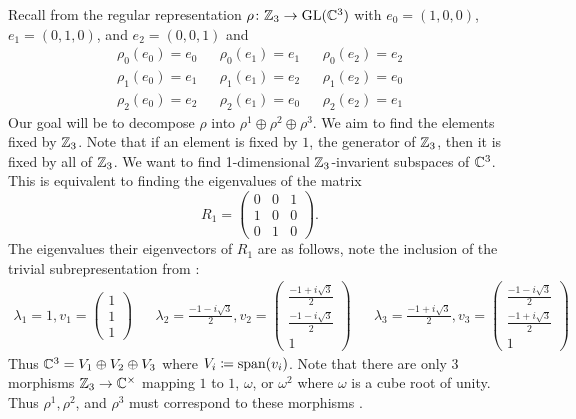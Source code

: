 \documentclass[letterpaper, 11pt, oneside]{book}
\begin{document}
\begin{ex}
  Recall from  the regular representation $\rho\colon \mathbb{Z}_{3} \to \operatorname{GL}(\mathbb{C}^{3})$ with $e_{0} = (1, 0, 0)$, $e_{1} = (0, 1, 0)$, and $e_{2} = (0, 0, 1)$ and
  \begin{align*}
    \rho_{0}(e_{0}) = e_{0} && \rho_{0}(e_{1}) = e_{1} && \rho_{0}(e_{2}) = e_{2} \\
    \rho_{1}(e_{0}) = e_{1} && \rho_{1}(e_{1}) = e_{2} && \rho_{1}(e_{2}) = e_{0} \\
    \rho_{2}(e_{0}) = e_{2} && \rho_{2}(e_{1}) = e_{0} && \rho_{2}(e_{2}) = e_{1}
  \end{align*}
  Our goal will be to decompose $\rho$ into $\rho^{1} \oplus \rho^{2} \oplus \rho^{3}$.
  We aim to find the elements fixed by $\mathbb{Z}_{3}$.
  Note that if an element is fixed by $1$, the generator of $\mathbb{Z}_{3}$, then it is fixed by all of $\mathbb{Z}_{3}$.
  We want to find 1-dimensional $\mathbb{Z}_3$-invarient subspaces of $\mathbb{C}^{3}$.
  This is equivalent to finding the eigenvalues of the matrix
  \[
    R_{1} = \begin{pmatrix} 0 & 0 & 1 \\ 1 & 0 & 0 \\ 0 & 1 & 0 \end{pmatrix}.
  \]
  The eigenvalues their eigenvectors of $R_{1}$ are as follows, note the inclusion of the trivial subrepresentation from :
  \begin{align*}
    \lambda_{1} = 1, v_{1} = \begin{pmatrix} 1 \\ 1 \\ 1 \end{pmatrix} && \lambda_{2} = \frac{-1 -i \sqrt{3}}{2}, v_{2} = \begin{pmatrix} \frac{-1 + i \sqrt{3}}{2} \\ \frac{-1 -i \sqrt{3}}{2} \\ 1 \end{pmatrix} && \lambda_{3} = \frac{-1 + i \sqrt{3}}{2}, v_{3} = \begin{pmatrix} \frac{-1 - i \sqrt{3}}{2} \\ \frac{-1 + i \sqrt{3}}{2} \\ 1 \end{pmatrix}
  \end{align*}
  Thus $\mathbb{C}^{3} = V_{1} \oplus V_{2} \oplus V_{3}$ where $V_{i} \coloneqq \operatorname{span}(v_{i})$.
  Note that there are only 3 morphisms $\mathbb{Z}_{3} \to \mathbb{C}^{\times}$ mapping $1$ to $1$, $\omega$, or $\omega^{2}$ where $\omega$ is a cube root of unity.
  Thus $\rho^{1}, \rho^2$, and $\rho^{3}$ must correspond to these morphisms .
\end{ex}
\end{document}
